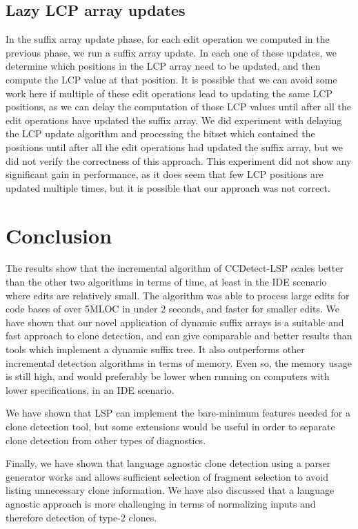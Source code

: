 \subsection*{Lazy LCP array updates}

In the suffix array update phase, for each edit operation we computed in the previous
phase, we run a suffix array update. In each one of these updates, we determine which
positions in the LCP array need to be updated, and then compute the LCP value at that
position. It is possible that we can avoid some work here if multiple of these edit
operations lead to updating the same LCP positions, as we can delay the computation of
those LCP values until after all the edit operations have updated the suffix array. We did
experiment with delaying the LCP update algorithm and processing the bitset which
contained the positions until after all the edit operations had updated the suffix array,
but we did not verify the correctness of this approach. This experiment did not show any
significant gain in performance, as it does seem that few LCP positions are updated
multiple times, but it is possible that our approach was not correct.


\section{Conclusion}

The results show that the incremental algorithm of CCDetect-LSP scales better than the
other two algorithms in terms of time, at least in the IDE scenario where edits are
relatively small. The algorithm was able to process large edits for code bases of over
5MLOC in under 2 seconds, and faster for smaller edits. We have shown that our novel
application of dynamic suffix arrays is a suitable and fast approach to clone detection,
and can give comparable and better results than tools which implement a dynamic suffix
tree. It also outperforms other incremental detection algorithms in terms of memory. Even
so, the memory usage is still high, and would preferably be lower when running on
computers with lower specifications, in an IDE scenario. 

We have shown that LSP can implement the bare-minimum features needed for a clone
detection tool, but some extensions would be useful in order to separate clone detection
from other types of diagnostics.

Finally, we have shown that language agnostic clone detection using a parser generator
works and allows sufficient selection of fragment selection to avoid listing unnecessary
clone information. We have also discussed that a language agnostic approach is more
challenging in terms of normalizing inputs and therefore detection of type-2 clones.
